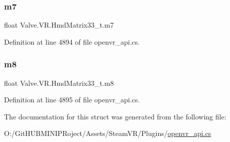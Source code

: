 \subsubsection{\texorpdfstring{m7}{m7}}
{\footnotesize\ttfamily float Valve.\+V\+R.\+Hmd\+Matrix33\+\_\+t.\+m7}



Definition at line 4894 of file openvr\+\_\+api.\+cs.

\mbox{\label{struct_valve_1_1_v_r_1_1_hmd_matrix33__t_aaae3e4fa1393cc4e445761495e60e6e8}} 
\subsubsection{\texorpdfstring{m8}{m8}}
{\footnotesize\ttfamily float Valve.\+V\+R.\+Hmd\+Matrix33\+\_\+t.\+m8}



Definition at line 4895 of file openvr\+\_\+api.\+cs.



The documentation for this struct was generated from the following file\+:\begin{DoxyCompactItemize}
\item 
O\+:/\+Git\+H\+U\+B\+M\+I\+N\+I\+P\+Roject/\+Assets/\+Steam\+V\+R/\+Plugins/\mbox{\hyperlink{openvr__api_8cs}{openvr\+\_\+api.\+cs}}\end{DoxyCompactItemize}
